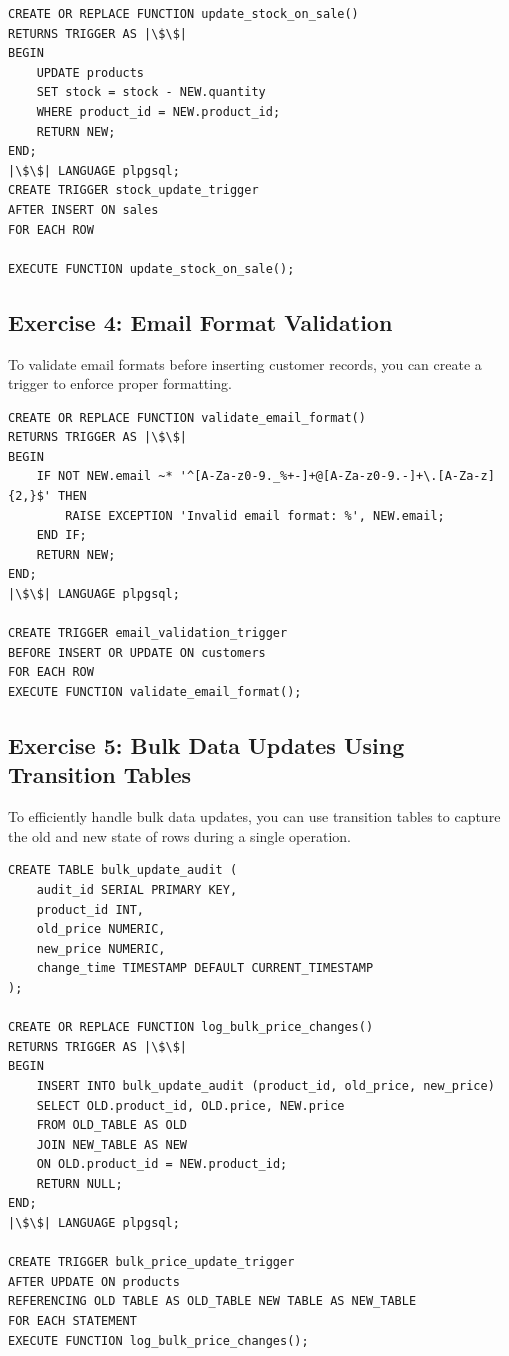 \documentclass{article}
\begin{document}
\begin{verbatim}
CREATE OR REPLACE FUNCTION update_stock_on_sale()
RETURNS TRIGGER AS |\$\$|
BEGIN
    UPDATE products
    SET stock = stock - NEW.quantity
    WHERE product_id = NEW.product_id;
    RETURN NEW;
END;
|\$\$| LANGUAGE plpgsql;
CREATE TRIGGER stock_update_trigger
AFTER INSERT ON sales
FOR EACH ROW

EXECUTE FUNCTION update_stock_on_sale();
\end{verbatim}

\subsection*{Exercise 4: Email Format Validation}
To validate email formats before inserting customer records, you can create a trigger to enforce proper formatting.

\begin{verbatim}
CREATE OR REPLACE FUNCTION validate_email_format()
RETURNS TRIGGER AS |\$\$|
BEGIN
    IF NOT NEW.email ~* '^[A-Za-z0-9._%+-]+@[A-Za-z0-9.-]+\.[A-Za-z]{2,}$' THEN
        RAISE EXCEPTION 'Invalid email format: %', NEW.email;
    END IF;
    RETURN NEW;
END;
|\$\$| LANGUAGE plpgsql;

CREATE TRIGGER email_validation_trigger
BEFORE INSERT OR UPDATE ON customers
FOR EACH ROW
EXECUTE FUNCTION validate_email_format();
\end{verbatim}

\subsection*{Exercise 5: Bulk Data Updates Using Transition Tables}
To efficiently handle bulk data updates, you can use transition tables to capture the old and new state of rows during a single operation.

\begin{verbatim}
CREATE TABLE bulk_update_audit (
    audit_id SERIAL PRIMARY KEY,
    product_id INT,
    old_price NUMERIC,
    new_price NUMERIC,
    change_time TIMESTAMP DEFAULT CURRENT_TIMESTAMP
);

CREATE OR REPLACE FUNCTION log_bulk_price_changes()
RETURNS TRIGGER AS |\$\$|
BEGIN
    INSERT INTO bulk_update_audit (product_id, old_price, new_price)
    SELECT OLD.product_id, OLD.price, NEW.price
    FROM OLD_TABLE AS OLD
    JOIN NEW_TABLE AS NEW
    ON OLD.product_id = NEW.product_id;
    RETURN NULL;
END;
|\$\$| LANGUAGE plpgsql;

CREATE TRIGGER bulk_price_update_trigger
AFTER UPDATE ON products
REFERENCING OLD TABLE AS OLD_TABLE NEW TABLE AS NEW_TABLE
FOR EACH STATEMENT
EXECUTE FUNCTION log_bulk_price_changes();
\end{verbatim}
\end{document}
